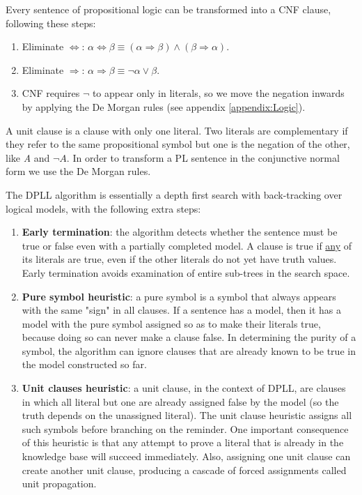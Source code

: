 \documentclass{article}
\begin{document}
Every sentence of propositional logic can be transformed into a CNF clause, following these steps:
\begin{enumerate}
    \item Eliminate $\Leftrightarrow$: $\alpha \Leftrightarrow \beta \equiv (\alpha \Rightarrow \beta) \land (\beta \Rightarrow \alpha)$.
    \item Eliminate $\Rightarrow$: $\alpha \Rightarrow \beta \equiv \neg \alpha \lor \beta$.
    \item CNF requires $\neg$ to appear only in literals, so we move the negation inwards by applying the De Morgan rules (see appendix \ref{appendix:Logic}).
\end{enumerate}

A unit clause is a clause with only one literal. Two literals are complementary if they refer to the same propositional symbol but one is the negation of the other, like \textit{A} and $\neg A$. In order to transform a PL sentence in the conjunctive normal form we use the De Morgan rules.

\noindent 
The DPLL algorithm is essentially a depth first search with back-tracking over logical models, with the following extra steps:
\begin{enumerate}
    \item \textbf{Early termination}: the algorithm detects whether the sentence must be true or false even with a partially completed model. A clause is true if \underline{any} of its literals are true, even if the other literals do not yet have truth values. Early termination avoids examination of entire sub-trees in the search space.
    \item \textbf{Pure symbol heuristic}: a pure symbol is a symbol that always appears with the same "sign" in all clauses. If a sentence has a model, then it has a model with the pure symbol assigned so as to make their literals true, because doing so can never make a clause false. In determining the purity of a symbol, the algorithm can ignore clauses that are already known to be true in the model constructed so far.
    \item \textbf{Unit clauses heuristic}: a unit clause, in the context of DPLL, are clauses in which all literal but one are already assigned false by the model (so the truth depends on the unassigned literal). The unit clause heuristic assigns all such symbols before branching on the reminder. One important consequence of this heuristic is that any attempt to prove a literal that is already in the knowledge base will succeed immediately. Also, assigning one unit clause can create another unit clause, producing a cascade of forced assignments called unit propagation.  
\end{enumerate}
\end{document}
